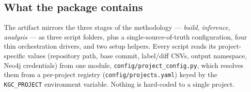 \documentclass[11pt,a4paper]{article}
\newcommand{\code}[1]{\texttt{#1}}
\begin{document}
	\subsection{What the package contains}\label{sec:repro-contents}
	The artifact mirrors the three stages of the methodology --- \emph{build},
	\emph{inference}, \emph{analysis} --- as three script folders, plus a
	single-source-of-truth configuration, four thin orchestration drivers, and two
	setup helpers. Every script reads its project-specific values (repository path,
	base commit, label/diff CSVs, output namespace, Neo4j credentials) from one
	module, \code{config/project\_config.py}, which resolves them from a per-project
	registry (\code{config/projects.yaml}) keyed by the \code{KGC\_PROJECT}
	environment variable. Nothing is hard-coded to a single project.
\end{document}
